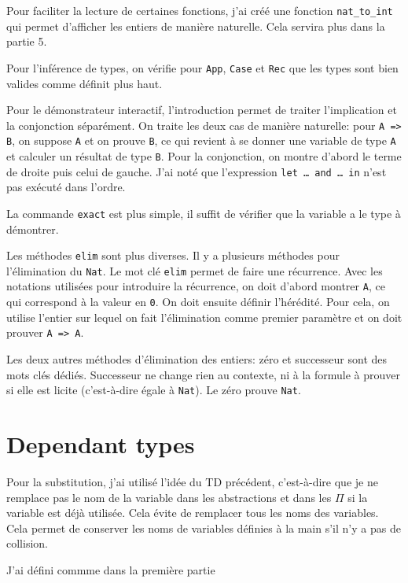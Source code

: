 \documentclass[a4paper]{article}
\begin{document}
    Pour faciliter la lecture de certaines fonctions, j'ai créé une fonction \verb|nat_to_int| qui permet d'afficher les entiers de manière naturelle. Cela servira plus dans la partie 5.

    Pour l'inférence de types, on vérifie pour \verb|App|, \verb|Case| et \verb|Rec| que les types sont bien valides comme définit plus haut. 

    Pour le démonstrateur interactif, l'introduction permet de traiter l'implication et la conjonction séparément. On traite les deux cas de manière naturelle: pour \verb|A => B|, on suppose \verb|A| et on prouve \verb|B|, ce qui revient à se donner une variable de type \verb|A| et calculer un résultat de type \verb|B|. Pour la conjonction, on montre d'abord le terme de droite puis celui de gauche. J'ai noté que l'expression \verb-let … and … in- n'est pas exécuté dans l'ordre. 

    La commande \verb|exact| est plus simple, il suffit de vérifier que la variable a le type à démontrer. 

    Les méthodes \verb|elim| sont plus diverses. Il y a plusieurs méthodes pour l'élimination du \verb|Nat|. Le mot clé \verb|elim| permet de faire une récurrence. Avec les notations utilisées pour introduire la récurrence, on doit d'abord montrer \verb|A|, ce qui correspond à la valeur en \verb|0|. On doit ensuite définir l'hérédité. Pour cela, on utilise l'entier sur lequel on fait l'élimination comme premier paramètre et on doit prouver \verb|A => A|. 

    Les deux autres méthodes d'élimination des entiers: zéro et successeur sont des mots clés dédiés. Successeur ne change rien au contexte, ni à la formule à prouver si elle est licite (c'est-à-dire égale à \verb|Nat|). Le zéro prouve \verb|Nat|.


    \section{Dependant types}

    Pour la substitution, j'ai utilisé l'idée du TD précédent, c'est-à-dire que je ne remplace pas le nom de la variable dans les abstractions et dans les $\Pi$ si la variable est déjà utilisée. Cela évite de remplacer tous les noms des variables. Cela permet de conserver les noms de variables définies à la main s'il n'y a pas de collision. 

    J'ai défini commme dans la première partie 
\end{document}
